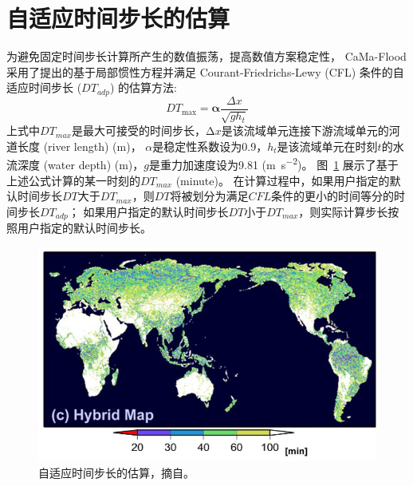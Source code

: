 \section{自适应时间步长的估算}
为避免固定时间步长计算所产生的数值振荡，提高数值方案稳定性，
CaMa-Flood 采用了\citet{bates2010}提出的基于局部惯性方程并满足 Courant-Friedrichs-Lewy (CFL) 
条件的自适应时间步长 ($DT_{adp}$) 的估算方法:
\begin{equation}
{DT}_{\max }=\boldsymbol{\alpha} \frac{\Delta x}{\sqrt{g h_{t}}}
\end{equation}
上式中$DT_{max}$是最大可接受的时间步长，$∆x$是该流域单元连接下游流域单元的河道长度 (river length) (m)，
$\alpha$是稳定性系数设为0.9，$h_t$是该流域单元在时刻$t$的水流深度 (water depth) (m)，$g$是重力加速度设为9.81 (\unit{m.s^{-2}})。
图~\ref{fig:自适应时间步长的估算} 展示了基于上述公式计算的某一时刻的$DT_{max}$ (minute)。
在计算过程中，如果用户指定的默认时间步长$DT$大于$DT_{max}$，则$DT$将被划分为满足$CFL$条件的更小的时间等分的时间步长$DT_{adp}$；
如果用户指定的默认时间步长$DT$小于$DT_{max}$，则实际计算步长按照用户指定的默认时间步长。

{
\begin{figure}[htbp]
\centering
\includegraphics{Figures/陆地表面的水分循环/自适应时间步长的估算.png}
\caption{自适应时间步长的估算，摘自\citet{yamazaki2013improving}。}
\label{fig:自适应时间步长的估算}
\end{figure}
}
